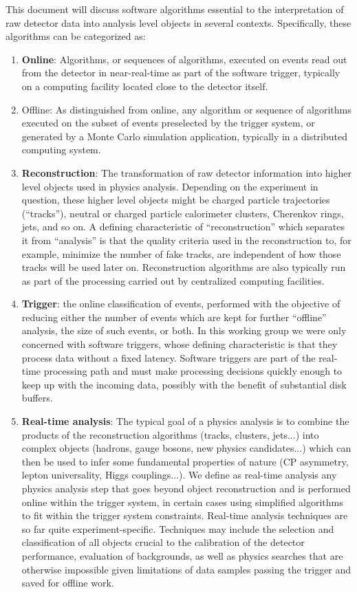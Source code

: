 This document will discuss software algorithms essential to the interpretation of raw detector data into analysis level objects in several contexts. 
Specifically, these algorithms can be categorized as: 
\begin{enumerate}
\item {\bf Online}: Algorithms, or sequences of algorithms, executed on events read out from the detector in near-real-time as part of the software trigger, typically 
on a computing facility located close to the detector itself.
\item Offline: As distinguished from online, any algorithm or sequence of algorithms executed on the subset of events preselected by the trigger system, or generated 
by a Monte Carlo simulation application, typically in a distributed computing system.
\item
{\bf Reconstruction}: The transformation of raw detector information into higher level objects used in physics analysis. Depending on the experiment in question, these 
higher level objects might be charged particle trajectories (``tracks''), neutral or charged particle calorimeter clusters, Cherenkov rings, jets, and so on. A defining 
characteristic of ``reconstruction'' which separates it from ``analysis'' is that the quality criteria used in the reconstruction to, for example, minimize the number of 
fake tracks, are independent of how those tracks will be used later on. Reconstruction algorithms are also typically run as part of the processing carried out by centralized computing facilities.
\item
{\bf Trigger}: the online classification of events, performed with the objective of reducing either the number of events which are kept for further ``offline'' analysis, 
the size of such events, or both. In this working group we were only concerned with software triggers, whose defining characteristic is that they process data without a 
fixed latency. Software triggers are part of the real-time processing path and must make processing decisions quickly enough to keep up with the incoming data, possibly 
with the benefit of substantial disk buffers.
\item
{\bf Real-time analysis}: The typical goal of a physics analysis is to combine the products of the reconstruction algorithms (tracks, clusters, jets...) into complex 
objects (hadrons, gauge bosons, new physics candidates...) which can then be used to infer some fundamental properties of nature (CP asymmetry, lepton universality, Higgs couplings...). 
We define as real-time analysis any physics analysis step that goes beyond object reconstruction and is performed online within the trigger system, in certain cases 
using simplified algorithms to fit within the trigger system constraints. Real-time analysis techniques are so far quite experiment-specific. Techniques may include 
the selection and classification of all objects crucial to the calibration of the detector performance, evaluation of backgrounds, as well as physics searches that are 
otherwise impossible given limitations of data samples passing the trigger and saved for offline work.
\end{enumerate}

